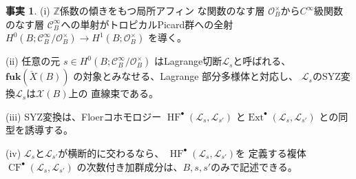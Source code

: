 \documentclass[uplatex,dvipdfmx,12pt]{jsarticle}
\numberwithin{equation}{section}
\theoremstyle{definition}
\newtheorem{fact}[theorem]{事実}
\newcommand{\opn}[1]{\operatorname{#1}}
\newcommand{\catn}[1]{\mathbf{#1}}
\begin{document}
\begin{fact}
\hspace{-8pt} (i) $\mathbb{Z}$係数の傾きをもつ局所アフィン
な関数のなす層
$\mathcal{O}_B^{\times}$から$C^{\infty}$級関数のなす層
$\mathcal{C}^{\infty}_B$への単射がトロピカルPicard群への全射
$H^{0}(B;\mathcal{C}^{\infty}_B/\mathcal{O}_B^{\times})
\to H^{1}(B;\mathcal{O}_B^{\times})$ を導く。

\hspace{-10pt} (ii) 任意の元 $s\in 
H^{0}(B;\mathcal{C}^{\infty}_B/\mathcal{O}_B^{\times})$ 
はLagrange切断$\mathscr{L}_s$と呼ばれる、
$\catn{fuk}(\check{X}(B))$ の対象とみなせる、Lagrange
部分多様体と対応し、
$\mathscr{L}_s$のSYZ変換$\mathcal{L}_s$は$\mathcal{X}(B)$上の
直線束である。

\hspace{-12pt} (iii) SYZ変換は、Floerコホモロジー
$\opn{HF}^{\bullet}(\mathscr{L}_s,\mathscr{L}_{s'})$
と$\opn{Ext}^{\bullet}
(\mathcal{L}_s,\mathcal{L}_{s'})$ との同型を誘導する。

\hspace{-12pt} (iv) 
$\mathscr{L}_s$と$\mathscr{L}_{s'}$が横断的に交わるなら、
$\opn{HF}^{\bullet}(\mathscr{L}_s,\mathscr{L}_{s'})$を
定義する複体$\opn{CF}^{\bullet}(\mathscr{L}_s,\mathscr{L}_{s'})$
の次数付き加群成分は、$B,s,s'$のみで記述できる。
\end{fact}
\end{document}

